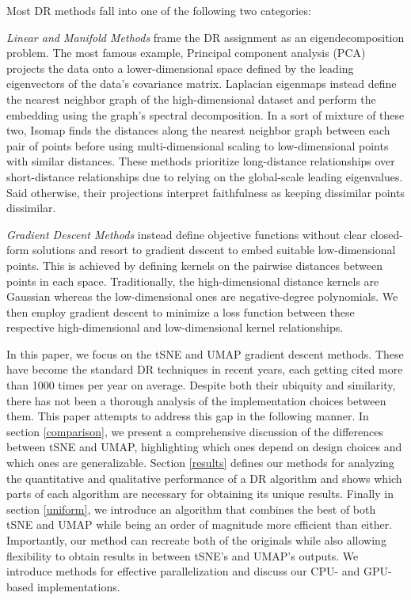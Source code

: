 \documentclass{article}
\theoremstyle{definition}
\begin{document}
Most DR methods fall into one of the following two categories:

\textit{Linear and Manifold Methods} frame the DR assignment as an eigendecomposition problem. The most famous example, Principal component analysis (PCA) projects the
data onto a lower-dimensional space defined by the leading eigenvectors of the data's covariance matrix. Laplacian eigenmaps \cite{belkin2003laplacian} instead define the nearest neighbor
graph of the high-dimensional dataset and perform the embedding using the graph's spectral decomposition. In a sort of mixture of these two, Isomap \cite{tenenbaum2000global} finds the
distances along the nearest neighbor graph between each pair of points before using multi-dimensional scaling to low-dimensional points with similar distances.
These methods prioritize long-distance relationships over short-distance relationships due to relying on the global-scale leading eigenvalues. Said
otherwise, their projections interpret faithfulness as keeping dissimilar points dissimilar.

\textit{Gradient Descent Methods} instead define objective functions without clear closed-form solutions and resort to gradient descent to embed
suitable low-dimensional points. This is achieved by defining kernels on the pairwise distances between points in each space. Traditionally, the
high-dimensional distance kernels are Gaussian whereas the low-dimensional ones are negative-degree polynomials. We then employ gradient descent to minimize
a loss function between these respective high-dimensional and low-dimensional kernel relationships.

In this paper, we focus on the tSNE \cite{van2008visualizing} and UMAP \cite{mcinnes2018umap} gradient descent methods. These have become the standard DR
techniques in recent years, each getting cited more than
1000 times per year on average. Despite both their ubiquity and similarity, there has not been a thorough analysis of the implementation choices between them.
 This paper attempts to address this gap in the following manner. In section \ref{comparison}, we present a comprehensive discussion of the
differences between tSNE and UMAP, highlighting which ones depend on design choices and which ones are generalizable. Section \ref{results} defines our methods for
analyzing the quantitative and qualitative performance of a DR algorithm and shows which parts of each algorithm are necessary for obtaining its unique results. Finally in
section \ref{uniform}, we introduce an algorithm that combines the best of both tSNE and UMAP while being an order of magnitude more efficient than either.
Importantly, our method can recreate both of the originals while also allowing flexibility to obtain results in between tSNE's and UMAP's outputs. We introduce
methods for effective parallelization and discuss our CPU- and GPU-based implementations.
\end{document}
